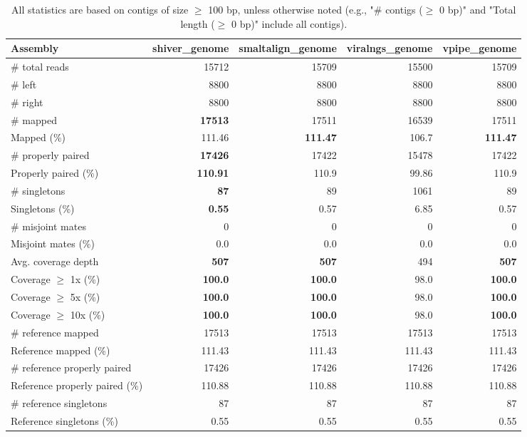 \documentclass[12pt,a4paper]{article}
\begin{document}
\begin{table}[ht]
\begin{center}
\caption{All statistics are based on contigs of size $\geq$ 100 bp, unless otherwise noted (e.g., "\# contigs ($\geq$ 0 bp)" and "Total length ($\geq$ 0 bp)" include all contigs).}
\begin{tabular}{|l*{4}{|r}|}
\hline
Assembly & shiver\_genome & smaltalign\_genome & viralngs\_genome & vpipe\_genome \\ \hline
\# total reads & 15712 & 15709 & 15500 & 15709 \\ \hline
\# left & 8800 & 8800 & 8800 & 8800 \\ \hline
\# right & 8800 & 8800 & 8800 & 8800 \\ \hline
\# mapped & {\bf 17513} & 17511 & 16539 & 17511 \\ \hline
Mapped (\%) & 111.46 & {\bf 111.47} & 106.7 & {\bf 111.47} \\ \hline
\# properly paired & {\bf 17426} & 17422 & 15478 & 17422 \\ \hline
Properly paired (\%) & {\bf 110.91} & 110.9 & 99.86 & 110.9 \\ \hline
\# singletons & {\bf 87} & 89 & 1061 & 89 \\ \hline
Singletons (\%) & {\bf 0.55} & 0.57 & 6.85 & 0.57 \\ \hline
\# misjoint mates & 0 & 0 & 0 & 0 \\ \hline
Misjoint mates (\%) & 0.0 & 0.0 & 0.0 & 0.0 \\ \hline
Avg. coverage depth & {\bf 507} & {\bf 507} & 494 & {\bf 507} \\ \hline
Coverage $\geq$ 1x (\%) & {\bf 100.0} & {\bf 100.0} & 98.0 & {\bf 100.0} \\ \hline
Coverage $\geq$ 5x (\%) & {\bf 100.0} & {\bf 100.0} & 98.0 & {\bf 100.0} \\ \hline
Coverage $\geq$ 10x (\%) & {\bf 100.0} & {\bf 100.0} & 98.0 & {\bf 100.0} \\ \hline
\# reference mapped & 17513 & 17513 & 17513 & 17513 \\ \hline
Reference mapped (\%) & 111.43 & 111.43 & 111.43 & 111.43 \\ \hline
\# reference properly paired & 17426 & 17426 & 17426 & 17426 \\ \hline
Reference properly paired (\%) & 110.88 & 110.88 & 110.88 & 110.88 \\ \hline
\# reference singletons & 87 & 87 & 87 & 87 \\ \hline
Reference singletons (\%) & 0.55 & 0.55 & 0.55 & 0.55 \\ \hline

\end{tabular}
\end{center}
\end{table}
\end{document}
